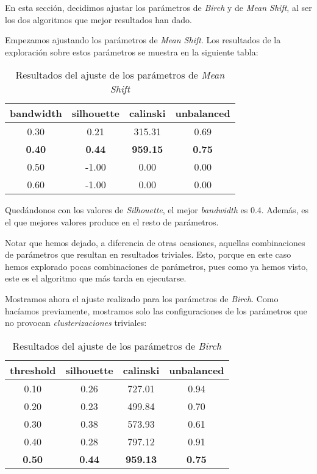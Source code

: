 \documentclass[11pt]{article}
\begin{document}
En esta sección, decidimos ajustar los parámetros de \emph{Birch} y de \emph{Mean Shift}, al ser los dos algoritmos que mejor resultados han dado.

Empezamos ajustando los parámetros de \emph{Mean Shift}. Los resultados de la exploración sobre estos parámetros se muestra en la siguiente tabla:

\begin{table}[H]
\begin{center}
    \begin{tabular}{|c|c|c|c|}
        \hline
            bandwidth & silhouette & calinski & unbalanced \\
        \hline
            0.30 &  0.21 &  315.31 &  0.69 \\
            \textbf{0.40} &  \textbf{0.44} &  \textbf{959.15} &  \textbf{0.75} \\
            0.50 &  -1.00 &  0.00 &  0.00 \\
            0.60 &  -1.00 &  0.00 &  0.00 \\

        \hline
    \end{tabular}
\end{center}
    \caption{Resultados del ajuste de los parámetros de \emph{Mean Shift}}
\end{table}

Quedándonos con los valores de \emph{Silhouette}, el mejor \emph{bandwidth} es 0.4. Además, es el que mejores valores produce en el resto de parámetros.

Notar que hemos dejado, a diferencia de otras ocasiones, aquellas combinaciones de parámetros que resultan en resultados triviales. Esto, porque en este caso hemos explorado pocas combinaciones de parámetros, pues como ya hemos visto, este es el algoritmo que más tarda en ejecutarse.

Mostramos ahora el ajuste realizado para los parámetros de \emph{Birch}. Como hacíamos previamente, mostramos solo las configuraciones de los parámetros que no provocan \emph{clusterizaciones} triviales:

\begin{table}[H]
\begin{center}
    \begin{tabular}{|c|c|c|c|}
        \hline
            threshold & silhouette & calinski & unbalanced \\
        \hline

            0.10 &  0.26 &  727.01 &  0.94 \\
            0.20 &  0.23 &  499.84 &  0.70 \\
            0.30 &  0.38 &  573.93 &  0.61 \\
            0.40 &  0.28 &  797.12 &  0.91 \\
            \textbf{0.50} &  \textbf{0.44} &  \textbf{959.13} &  \textbf{0.75} \\

        \hline
    \end{tabular}
\end{center}
    \caption{Resultados del ajuste de los parámetros de \emph{Birch}}
\end{table}
\end{document}
